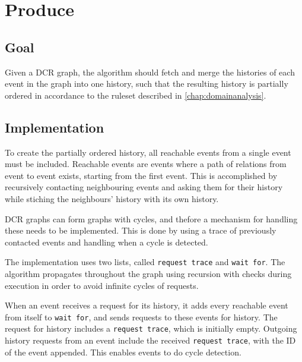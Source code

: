 \section{Produce}
\subsection{Goal} %
Given a DCR graph, the algorithm should fetch and merge the histories of each event in the graph into one history, such that the resulting history is partially ordered in accordance to the ruleset described in \autoref{chap:domainanalysis}. 


\subsection{Implementation} %
To create the partially ordered history, all reachable events from a single event must be included. Reachable events are events where a path of relations from event to event exists, starting from the first event. This is accomplished by recursively contacting neighbouring events and asking them for their history while stiching the neighbours' history with its own history. 

\newpar DCR graphs can form graphs with cycles, and thefore a mechanism for handling these needs to be implemented. This is done by using a trace of previously contacted events and handling when a cycle is detected.

\newpar The implementation uses two lists, called \texttt{request trace} and \texttt{wait for}.
The algorithm propagates throughout the graph using recursion with checks during execution in order to avoid infinite cycles of requests.

\newpar When an event receives a request for its history, it adds every reachable event from itself to \texttt{wait for}, and sends requests to these events for history. The request for history includes a \texttt{request trace}, which is initially empty. Outgoing history requests from an event include the received \texttt{request trace}, with the ID of the event appended. This enables events to do cycle detection.

